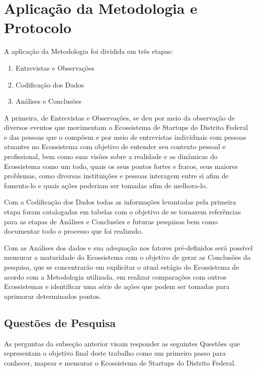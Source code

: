 \section{Aplicação da Metodologia e Protocolo}
\label{section:aplicacao_da_metodologia}

A aplicação da Metodologia foi dividida em três etapas:

\begin{enumerate}
  \item Entrevistas e Observações
  \item Codificação dos Dados
  \item Análises e Conclusões
\end{enumerate}

A primeira, de Entrevistas e Observações, se deu por meio da observação de diversos eventos que movimentam o Ecossistema de Startups do Distrito Federal e das pessoas que o compõem e por meio de entrevistas individuais com pessoas atuantes no Ecossistema com objetivo de entender seu contexto pessoal e profissional, bem como suas visões sobre a realidade e as dinâmicas do Ecossistema como um todo, quais os seus pontos fortes e fracos, seus maiores problemas, como diversas instituições e pessoas interagem entre si afim de fomenta-lo e quais ações poderiam ser tomadas afim de melhora-lo.

Com a Codificação dos Dados todas as informações levantadas pela primeira etapa foram catalogadas em tabelas com o objetivo de se tornarem referências para as etapas de Análises e Conclusões e futuras pesquisas bem como documentar todo o processo que foi realizado. 

Com as Análises dos dados e sua adequação nos fatores pré-definidos será possível mensurar a maturidade do Ecossistema com o objetivo de gerar as Conclusões da pesquisa, que se concentrarão em explicitar o atual estágio do Ecossistema de acordo com a Metodologia utilizada, em realizar comparações com outros Ecossistemas e identificar uma série de ações que podem ser tomadas para aprimorar determinados pontos.

\subsection{Questões de Pesquisa}
\label{subsection:questoes_de_pesquisa}

As perguntas da subseção anterior visam responder as seguintes Questões que representam o objetivo final deste trabalho como um primeiro passo para conhecer, mapear e mensurar o Ecossistema de Startups do Distrito Federal.


